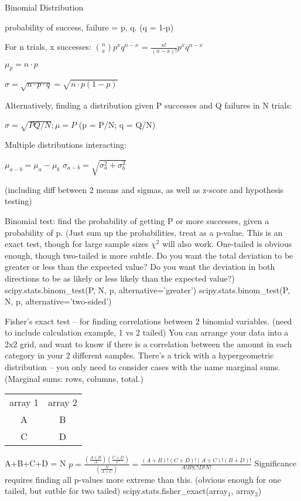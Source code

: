 \documentclass{slides}
\begin{document}
\newpage
Binomial Distribution

probability of success, failure = p, q. (q = 1-p)

For n trials, x successes: $\binom{n}{x}p^x q^{n-x}$ = $\frac{n!}{(n-x)!}p^x q^{n-x}$

$\mu_p = n \cdot p$

$\sigma = \sqrt{n \cdot p \cdot q} = \sqrt{n \cdot p (1-p)} $

Alternatively, finding a distribution given P successes and Q failures in N trials:

$\sigma = \sqrt{PQ/N}; \mu = P$ (p = P/N; q = Q/N)


Multiple distributions interacting:

$\mu_{a-b} = \mu_a - \mu_b$
$\sigma_{a-b} = \sqrt{\sigma_a^2 + \sigma_b^2}$


(including diff between 2 means and sigmas, as well as z-score and hypothesis testing)

Binomial test: find the probability of getting P or more successes, given a probability of p. (Just sum up the probabilities, treat as a p-value. This is an exact test, though for large sample sizes $\chi^2$ will also work. One-tailed is obvious enough, though two-tailed is more subtle. Do you want the total deviation to be greater or less than the expected value? Do you want the deviation in both directions to be as likely or less likely than the expected value?)
scipy.stats.binom\_test(P, N, p, alternative='greater')
scipy.stats.binom\_test(P, N, p, alternative='two-sided')

\newpage
Fisher's exact test -- for finding correlations between 2 binomial variables. (need to include calculation example, 1 vs 2 tailed)
You can arrange your data into a 2x2 grid, and want to know if there is a correlation between the amount in each category in your 2 different samples. There's a trick with a hypergeometric distribution -- you only need to consider cases with the name marginal sums. (Marginal sums: rows, columns, total.)

\begin{tabular}{c c}
 array 1 & array 2 \\
 A & B \\
 C & D \\
\end{tabular}
A+B+C+D = N
$p = \frac{(\frac{A+B}{A})(\frac{C+D}{C})}{(\frac{N}{A+C})} = \frac{(A+B)! (C+D)! (A+C)! (B+D)!}{A! B! C! D! N!}$
Significance requires finding all p-values more extreme than this. (obvious enough for one tailed, but sutble for two tailed)
scipy.stats.fisher\_exact(array$_1$, array$_2$)
\end{document}
